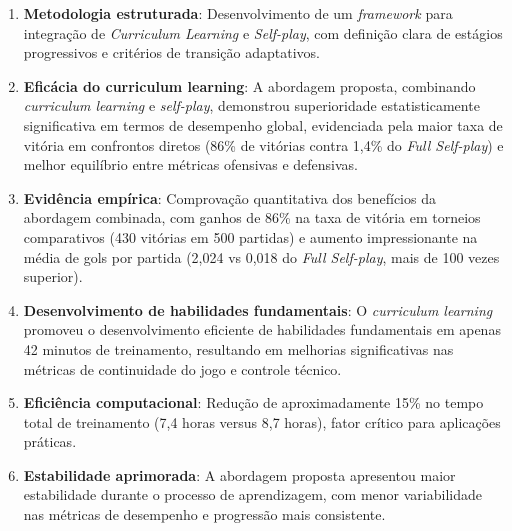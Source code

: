 \begin{enumerate}
    \item \textbf{Metodologia estruturada}: Desenvolvimento de um \textit{framework} para integração de \textit{Curriculum Learning} e \textit{Self-play}, com definição clara de estágios progressivos e critérios de transição adaptativos.
    
    \item \textbf{Eficácia do curriculum learning}: A abordagem proposta, combinando \textit{curriculum learning} e \textit{self-play}, demonstrou superioridade estatisticamente significativa em termos de desempenho global, evidenciada pela maior taxa de vitória em confrontos diretos (86\% de vitórias contra 1,4\% do \textit{Full Self-play}) e melhor equilíbrio entre métricas ofensivas e defensivas.
    
    \item \textbf{Evidência empírica}: Comprovação quantitativa dos benefícios da abordagem combinada, com ganhos de 86\% na taxa de vitória em torneios comparativos (430 vitórias em 500 partidas) e aumento impressionante na média de gols por partida (2,024 vs 0,018 do \textit{Full Self-play}, mais de 100 vezes superior).
    
    \item \textbf{Desenvolvimento de habilidades fundamentais}: O \textit{curriculum learning} promoveu o desenvolvimento eficiente de habilidades fundamentais em apenas 42 minutos de treinamento, resultando em melhorias significativas nas métricas de continuidade do jogo e controle técnico.
    
    \item \textbf{Eficiência computacional}: Redução de aproximadamente 15\% no tempo total de treinamento (7,4 horas versus 8,7 horas), fator crítico para aplicações práticas.
    
    \item \textbf{Estabilidade aprimorada}: A abordagem proposta apresentou maior estabilidade durante o processo de aprendizagem, com menor variabilidade nas métricas de desempenho e progressão mais consistente.
    
\end{enumerate}

